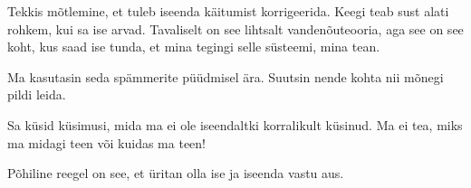 Tekkis mõtlemine, et tuleb iseenda käitumist korrigeerida. 
Keegi teab sust alati rohkem, kui sa ise arvad. 
Tavaliselt on see lihtsalt vandenõuteooria, aga see on see koht, kus saad ise 
tunda, et mina tegingi selle süsteemi, mina tean. 

Ma kasutasin seda spämmerite püüdmisel ära. Suutsin nende 
kohta nii mõnegi pildi leida.


Sa küsid küsimusi, mida ma ei ole iseendaltki korralikult küsinud. Ma ei tea, miks ma 
midagi teen või kuidas ma teen! 


Põhiline reegel on see, et üritan olla ise ja iseenda vastu aus.
